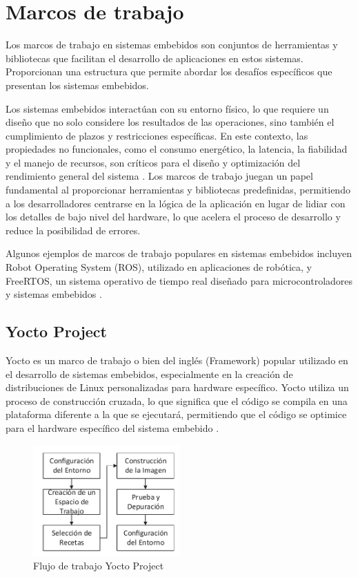 \section{Marcos de trabajo}

Los marcos de trabajo en sistemas embebidos son conjuntos de herramientas y bibliotecas que facilitan el desarrollo de aplicaciones en estos 
sistemas. Proporcionan una estructura que permite abordar los desafíos específicos que presentan los sistemas embebidos.

Los sistemas embebidos interactúan con su entorno físico, lo que requiere un diseño que no solo considere los resultados de las operaciones, sino también el cumplimiento de plazos y restricciones específicas. En este contexto, las propiedades no funcionales, como el consumo energético, la latencia, la fiabilidad y el manejo de recursos, son críticos para el diseño y optimización del rendimiento general del sistema \cite{Marugn2017SimulacinYV}. Los marcos de trabajo juegan un papel fundamental al proporcionar herramientas y bibliotecas predefinidas, permitiendo a los desarrolladores centrarse en la lógica de la  aplicación en lugar de lidiar con los detalles de bajo nivel del hardware, lo que acelera el proceso de desarrollo y reduce la posibilidad de errores. 

Algunos ejemplos de marcos de trabajo populares en sistemas embebidos incluyen Robot Operating System (ROS), utilizado en aplicaciones de robótica, y FreeRTOS, un sistema operativo de tiempo real diseñado para microcontroladores y sistemas embebidos \cite{HerreraLpez2023EntornoDT}.

\subsection{Yocto Project}\label{subsec:yocto}

Yocto es un marco de trabajo o bien del inglés (Framework) popular utilizado en el desarrollo de sistemas embebidos, especialmente en la creación de distribuciones de Linux personalizadas para hardware específico. Yocto utiliza un proceso de construcción cruzada, lo que significa que el código se compila en una plataforma diferente a la que se ejecutará, permitiendo que el código se optimice para el hardware específico del sistema embebido \cite{Leppakoski2013FrameworkFI}.

\begin{figure}[h!]
    \centering
    \includegraphics[width=0.5\textwidth]{fig/teorico/Flujo de trabajo de yocto.pdf}
    \caption{Flujo de trabajo Yocto Project}
    \label{fig:yocto_project_workflow}
\end{figure}

